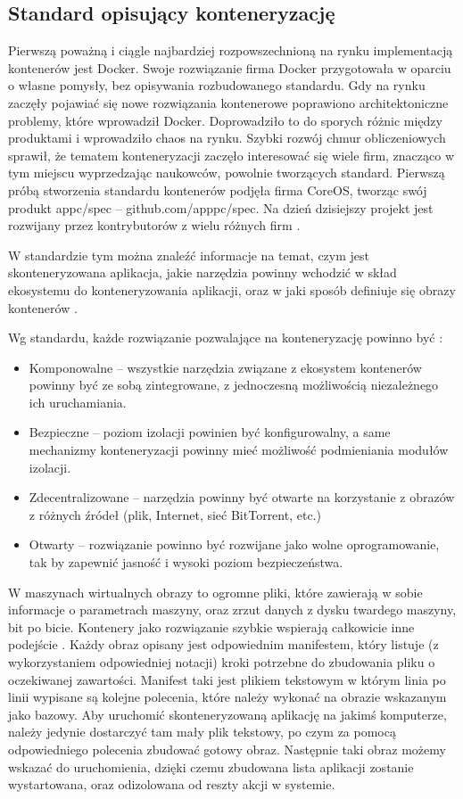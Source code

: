 \documentclass[10pt,a4paper,titlepage,twoside]{report}
\begin{document}
\subsection{Standard opisujący konteneryzację}\indent \indent
Pierwszą poważną i ciągle najbardziej rozpowszechnioną na rynku implementacją kontenerów jest Docker\cite{ad22}. Swoje rozwiązanie firma Docker przygotowała w oparciu o własne pomysły, bez opisywania rozbudowanego standardu. Gdy na rynku zaczęły pojawiać się nowe rozwiązania kontenerowe poprawiono architektoniczne problemy, które wprowadził Docker. Doprowadziło to do sporych różnic między produktami i wprowadziło chaos na rynku. Szybki rozwój chmur obliczeniowych sprawił, że tematem konteneryzacji zaczęło interesować się wiele firm, znacząco w tym miejscu wyprzedzając naukowców, powolnie tworzących standard. Pierwszą próbą stworzenia standardu kontenerów podjęła firma CoreOS, tworząc swój produkt appc/spec – github.com/apppc/spec. Na dzień dzisiejszy projekt jest rozwijany przez kontrybutorów z wielu różnych firm \cite{ad23}. 

\indent \indent W standardzie tym można znaleźć informacje na temat, czym jest skonteneryzowana aplikacja, jakie narzędzia powinny wchodzić w skład ekosystemu do konteneryzowania aplikacji, oraz w jaki sposób definiuje się obrazy kontenerów \cite{ad23}.

\indent \indent Wg standardu, każde rozwiązanie pozwalające na konteneryzację powinno być \cite{ad23}:
\begin{itemize}
	\item Komponowalne – wszystkie narzędzia związane z ekosystem kontenerów powinny być ze sobą zintegrowane, z jednoczesną możliwością niezależnego ich uruchamiania.
	\item Bezpieczne – poziom izolacji powinien być konfigurowalny, a same mechanizmy konteneryzacji powinny mieć możliwość podmieniania modułów izolacji.
	\item Zdecentralizowane – narzędzia powinny być otwarte na korzystanie z obrazów z różnych źródeł (plik, Internet, sieć BitTorrent, etc.)
	\item Otwarty – rozwiązanie powinno być rozwijane jako wolne oprogramowanie, tak by zapewnić jasność i wysoki poziom bezpieczeństwa.
\end{itemize}

W maszynach wirtualnych obrazy to ogromne pliki, które zawierają w sobie informacje o parametrach maszyny, oraz zrzut danych z dysku twardego maszyny, bit po bicie. Kontenery jako rozwiązanie szybkie wspierają całkowicie inne podejście \cite{ad24}. Każdy obraz opisany jest odpowiednim manifestem, który listuje (z wykorzystaniem odpowiedniej notacji) kroki potrzebne do zbudowania pliku o oczekiwanej zawartości. Manifest taki jest plikiem tekstowym w którym linia po linii wypisane są kolejne polecenia, które należy wykonać na obrazie wskazanym jako bazowy. Aby uruchomić skonteneryzowaną aplikację na jakimś komputerze, należy jedynie dostarczyć tam mały plik tekstowy, po czym za pomocą odpowiedniego polecenia zbudować gotowy obraz. Następnie taki obraz możemy wskazać do uruchomienia, dzięki czemu zbudowana lista aplikacji zostanie wystartowana, oraz odizolowana od reszty akcji w systemie.
\end{document}
